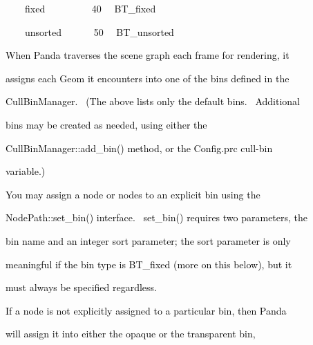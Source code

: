 \documentclass[a4paper]{article}
\newcommand\textstyleOOoComputerKeyWord[1]{\textrm{\textcolor[rgb]{0.0,0.0,0.5019608}{#1}}}
\begin{document}
{\color{black}
\textstyleOOoComputerKeyWord{\textcolor{black}{\ \ \ \ {\textquotedbl}fixed{\textquotedbl} \ \ \ \ \ \ \ \ \ 40
\ \ BT\_fixed}}}

{\color{black}
\textstyleOOoComputerKeyWord{\textcolor{black}{\ \ \ \ {\textquotedbl}unsorted{\textquotedbl} \ \ \ \ \ \ 50
\ \ BT\_unsorted}}}


\bigskip

{\color{black}
\textstyleOOoComputerKeyWord{\textcolor{black}{When Panda traverses the scene graph each frame for rendering, it}}}

{\color{black}
\textstyleOOoComputerKeyWord{\textcolor{black}{assigns each Geom it encounters into one of the bins defined in the}}}

{\color{black}
\textstyleOOoComputerKeyWord{\textcolor{black}{CullBinManager. \ (The above lists only the default bins. \ Additional}}}

{\color{black}
\textstyleOOoComputerKeyWord{\textcolor{black}{bins may be created as needed, using either the}}}

{\color{black}
\textstyleOOoComputerKeyWord{\textcolor{black}{CullBinManager::add\_bin() method, or the Config.prc
{\textquotedbl}cull-bin{\textquotedbl}}}}

{\color{black}
\textstyleOOoComputerKeyWord{\textcolor{black}{variable.)}}}


\bigskip

{\color{black}
\textstyleOOoComputerKeyWord{\textcolor{black}{You may assign a node or nodes to an explicit bin using the}}}

{\color{black}
\textstyleOOoComputerKeyWord{\textcolor{black}{NodePath::set\_bin() interface. \ set\_bin() requires two parameters,
the}}}

{\color{black}
\textstyleOOoComputerKeyWord{\textcolor{black}{bin name and an integer sort parameter; the sort parameter is only}}}

{\color{black}
\textstyleOOoComputerKeyWord{\textcolor{black}{meaningful if the bin type is BT\_fixed (more on this below), but it}}}

{\color{black}
\textstyleOOoComputerKeyWord{\textcolor{black}{must always be specified regardless.}}}


\bigskip

{\color{black}
\textstyleOOoComputerKeyWord{\textcolor{black}{If a node is not explicitly assigned to a particular bin, then Panda}}}

{\color{black}
\textstyleOOoComputerKeyWord{\textcolor{black}{will assign it into either the {\textquotedbl}opaque{\textquotedbl} or
the {\textquotedbl}transparent{\textquotedbl} bin,}}}
\end{document}
